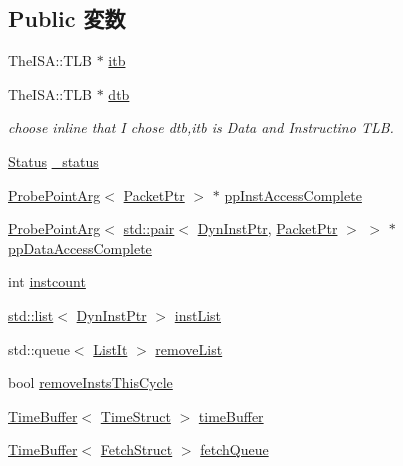 \subsection*{Public 変数}
\begin{DoxyCompactItemize}
\item 
TheISA::TLB $\ast$ \hyperlink{classFullO3CPU_abcb37ddc11515555d8484702697bc4bb}{itb}
\item 
TheISA::TLB $\ast$ \hyperlink{classFullO3CPU_ad2fd039621f87592c4b344d4f8948e78}{dtb}
\begin{DoxyCompactList}\small\item\em choose inline that I chose dtb,itb is Data and Instructino TLB. \item\end{DoxyCompactList}\item 
\hyperlink{classFullO3CPU_a67a0db04d321a74b7e7fcfd3f1a3f70b}{Status} \hyperlink{classFullO3CPU_a6cdf6e6db875a442f3ab6db542bd2bb5}{\_\-status}
\item 
\hyperlink{classProbePointArg}{ProbePointArg}$<$ \hyperlink{classPacket}{PacketPtr} $>$ $\ast$ \hyperlink{classFullO3CPU_aa39ae53643b00bc644caa5967b8a428a}{ppInstAccessComplete}
\item 
\hyperlink{classProbePointArg}{ProbePointArg}$<$ \hyperlink{classstd_1_1pair}{std::pair}$<$ \hyperlink{classFullO3CPU_a028ce10889c5f6450239d9e9a7347976}{DynInstPtr}, \hyperlink{classPacket}{PacketPtr} $>$ $>$ $\ast$ \hyperlink{classFullO3CPU_a4cbcb5b1a3968d3e5229656571604ba5}{ppDataAccessComplete}
\item 
int \hyperlink{classFullO3CPU_a19e374b98940ff65bd4d9d17f198738c}{instcount}
\item 
\hyperlink{classstd_1_1list}{std::list}$<$ \hyperlink{classFullO3CPU_a028ce10889c5f6450239d9e9a7347976}{DynInstPtr} $>$ \hyperlink{classFullO3CPU_ae10a391d02ce1ef67ee13cd82b7d46e5}{instList}
\item 
std::queue$<$ \hyperlink{classFullO3CPU_a184cb829e22cc656acb41864f68f51ea}{ListIt} $>$ \hyperlink{classFullO3CPU_a574cb1bed7660bb2bb6940365f6a3315}{removeList}
\item 
bool \hyperlink{classFullO3CPU_a2825a91132fe292d64dca3c61fd07410}{removeInstsThisCycle}
\item 
\hyperlink{classTimeBuffer}{TimeBuffer}$<$ \hyperlink{structTimeStruct}{TimeStruct} $>$ \hyperlink{classFullO3CPU_ad72b6568a4a40f54d071c31bef16bf2e}{timeBuffer}
\item 
\hyperlink{classTimeBuffer}{TimeBuffer}$<$ \hyperlink{classFullO3CPU_ae885ff43c757f445563029fd15cdf70c}{FetchStruct} $>$ \hyperlink{classFullO3CPU_a0b4f1aa3830d6db3cb15a9a46c531cc2}{fetchQueue}

\end{DoxyCompactItemize}
